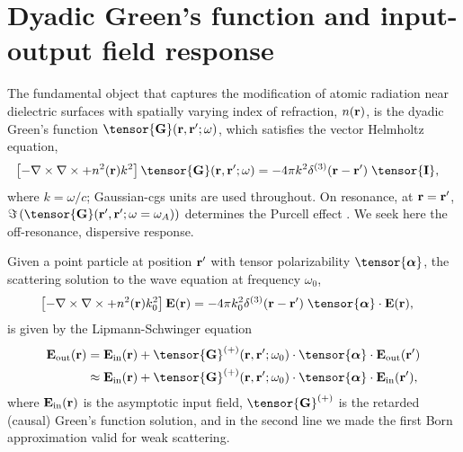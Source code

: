 \documentclass[preprint,aps,pra,onecolumn]{revtex4-1} %
\newcommand{\inp}{{\rm in}}
\newcommand{\out}{{\rm out}}
\begin{document}
\section{Dyadic Green's function and input-output field response}
The fundamental object that captures the modification of atomic radiation near dielectric surfaces 
with spatially varying index of refraction, $n(\mathbf{r})$, is the dyadic Green's function $\tensor{\mathbf{G}}(\br, \br';\omega)$, which satisfies the vector Helmholtz equation,
 \begin{align}
\left[ -\nabla\times\nabla\times + n^2(\mbf{r}) k^2 \right] \tensor{\mathbf{G}}(\br, \br';\omega) &= -4 \pi 
k^2 \delta^{(3)}(\mathbf{r}-\mathbf{r}')\;\tensor{\mathbf{I}},
\end{align}
where $k=\omega/c$; Gaussian-cgs units are used throughout.  On resonance, at $\mathbf{r}=\mathbf{r}'$, 
$\Im\left(\tensor{\mathbf{G}}(\br', \br'; \omega= \omega_A) \right)$ determines the Purcell effect \cite{}.  We 
seek here the off-resonance, dispersive response.

Given a point particle at position $\mathbf{r}'$ with tensor polarizability $\tensor{\boldsymbol{\alpha}}$, the  
scattering solution to the wave equation at frequency $\omega_0$,
\begin{align}\label{eq:Maxwellwithsource2}
\left[ - \nabla \times\nabla \times + n^2(\br)k_0^2 \right] \mathbf{E}(\br) &= -4\pi  k_0^2 
\delta^{(3)}(\br-\br')\;  \tensor{\boldsymbol{\alpha}}\cdot \mathbf{E}(\br),
\end{align}
is given by the Lipmann-Schwinger equation
\begin{align}
\mathbf{E}_{\out}(\br) &=\mathbf{E}_{\inp}(\br)+\tensor{\mathbf{G}}^{(+)}(\br , \br'; \omega_0)\cdot 
\tensor{\boldsymbol{\alpha}}\cdot \mathbf{E}_{\out}(\br')\\
&\approx \mathbf{E}_{\inp}(\br)+ \tensor{\mathbf{G}}^{(+)}(\br , \br'; \omega_0) \cdot 
\tensor{\boldsymbol{\alpha}}\cdot \mathbf{E}_{\inp}(\br'), \label{Eq::ScatteredField}
\end{align}
where $\mathbf{E}_{\inp}(\br)$ is the asymptotic input field, $\tensor{\mathbf{G}}^{(+)}$ is the retarded (causal) Green's function solution, and in the second line we made the first Born approximation valid for weak 
scattering.  
\end{document}
